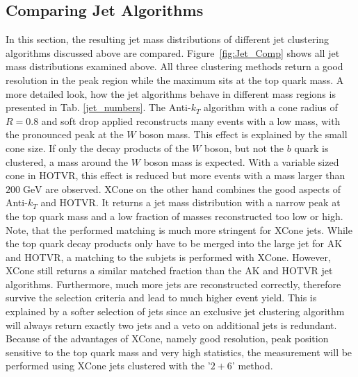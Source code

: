 \FloatBarrier %
\subsection{Comparing Jet Algorithms}
\label{sec:jet_comp}
	In this section, the resulting jet mass distributions of different jet clustering algorithms discussed above are compared. Figure~\ref{fig:Jet_Comp} shows all jet mass distributions examined above. All three clustering methods return a good resolution in the peak region while the maximum sits at the top quark mass. A more detailed look, how the jet algorithms behave in different mass regions is presented in Tab. \ref{jet_numbers}. The Anti-$k_T$ algorithm with a cone radius of $R=0.8$ and soft drop applied reconstructs many events with a low mass, with the pronounced peak at the $W$ boson mass. This effect is explained by the small cone size. If only the decay products of the $W$ boson, but not the $b$ quark is clustered, a mass around the $W$ boson mass is expected. With a variable sized cone in HOTVR, this effect is reduced but more events with a mass larger than $200\;\text{GeV}$ are observed. XCone on the other hand combines the good aspects of Anti-$k_T$ and HOTVR. It returns a jet mass distribution with a narrow peak at the top quark mass and a low fraction of masses reconstructed too low or high. Note, that the performed matching is much more stringent for XCone jets. While the top quark decay products only have to be merged into the large jet for AK and HOTVR, a matching to the subjets is performed with XCone. However, XCone still returns a similar matched fraction than the AK and HOTVR jet algorithms.  Furthermore, much more jets are reconstructed correctly, therefore survive the selection criteria and lead to much higher event yield. This is explained by a softer selection of jets since an exclusive jet clustering algorithm will always return exactly two jets and a veto on additional jets is redundant. Because of the advantages of XCone, namely good resolution, peak position sensitive to the top quark mass and very high statistics, the measurement will be performed using XCone jets clustered with the '$2+6$' method.
	
